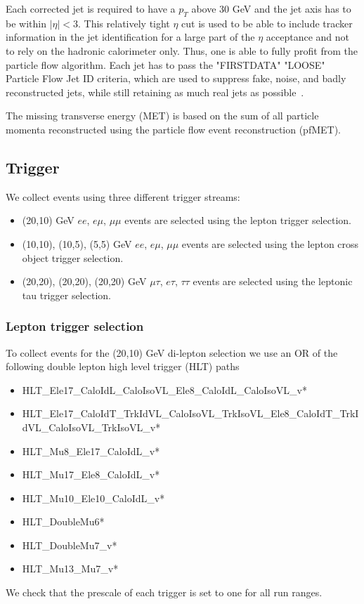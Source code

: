 Each corrected jet is required to have a $p_T$ above 30 GeV and 
the jet axis has to be within $|\eta| < 3$. This relatively tight $\eta$ cut is used 
to be able to include tracker information in the jet identification for a large part of the $\eta$ acceptance and 
not to rely on the hadronic calorimeter only. 
Thus, one is able to fully profit from the particle flow algorithm.
Each jet has to pass the "FIRSTDATA" "LOOSE" Particle Flow Jet ID criteria, which
are used to suppress fake, noise, and badly reconstructed jets, while
still retaining as much real jets as possible~\cite{pfjetid}.

The missing transverse energy (MET) is based on the sum of all particle 
momenta reconstructed using the particle flow event reconstruction (pfMET).

\subsection{Trigger}\label{sec:trigger}

We collect events using three different trigger streams:
\begin{itemize}
\item (20,10) GeV $ee$, $e\mu$, $\mu\mu$ events are selected using the lepton trigger selection.
\item (10,10), (10,5), (5,5) GeV $ee$, $e\mu$, $\mu\mu$ events are selected using the lepton \HT cross object trigger selection.
\item (20,20), (20,20), (20,20) GeV $\mu\tau$, $e\tau$, $\tau\tau$ events are selected using the leptonic tau trigger selection.
\end{itemize}

\subsubsection{Lepton trigger selection}
To collect events for the (20,10) GeV di-lepton selection
we use an OR of the following double lepton high level trigger (HLT) paths
\begin{itemize}
\item HLT\_Ele17\_CaloIdL\_CaloIsoVL\_Ele8\_CaloIdL\_CaloIsoVL\_v* 
\item HLT\_Ele17\_CaloIdT\_TrkIdVL\_CaloIsoVL\_TrkIsoVL\_Ele8\_CaloIdT\_TrkIdVL\_CaloIsoVL\_TrkIsoVL\_v* 
\item HLT\_Mu8\_Ele17\_CaloIdL\_v* 
\item HLT\_Mu17\_Ele8\_CaloIdL\_v* 
\item HLT\_Mu10\_Ele10\_CaloIdL\_v* 
\item HLT\_DoubleMu6* 
\item HLT\_DoubleMu7\_v* 
\item HLT\_Mu13\_Mu7\_v*
\end{itemize}
We check that the prescale of each trigger is set to one
for all run ranges.

